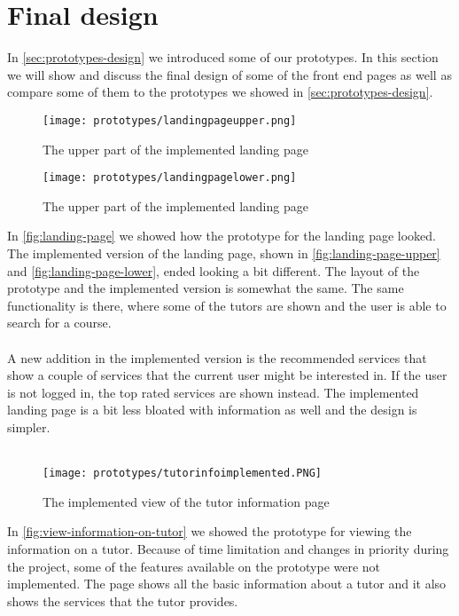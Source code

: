 \section{Final design}
In \autoref{sec:prototypes-design} we introduced some of our prototypes.
In this section we will show and discuss the final design of some of the front end pages as well as compare some of them to the prototypes we showed in \autoref{sec:prototypes-design}.
\begin{figure}
    \centering
    \texttt{[image: prototypes/landingpageupper.png]} 
    \caption{The upper part of the implemented landing page}
    \label{fig:landing-page-upper}
\end{figure}
\begin{figure}
    \centering
    \texttt{[image: prototypes/landingpagelower.png]} 
    \caption{The upper part of the implemented landing page}
    \label{fig:landing-page-lower}
\end{figure}
\noindent
In \autoref{fig:landing-page} we showed how the prototype for the landing page looked.
The implemented version of the landing page, shown in \autoref{fig:landing-page-upper} and \autoref{fig:landing-page-lower}, ended looking a bit different.
The layout of the prototype and the implemented version is somewhat the same. 
The same functionality is there, where some of the tutors are shown and the user is able to search for a course. 
\\\\
A new addition in the implemented version is the recommended services that show a couple of services that the current user might be interested in. 
If the user is not logged in, the top rated services are shown instead. 
The implemented landing page is a bit less bloated with information as well and the design is simpler.
\\\\
\begin{figure}
    \centering
    \texttt{[image: prototypes/tutorinfoimplemented.PNG]} 
    \caption{The implemented view of the tutor information page}
    \label{fig:tutor-info-implemented}
\end{figure}
\noindent
In \autoref{fig:view-information-on-tutor} we showed the prototype for viewing the information on a tutor.
Because of time limitation and changes in priority during the project, some of the features available on the prototype were not implemented. The page shows all the basic information about a tutor and it also shows the services that the tutor provides.
